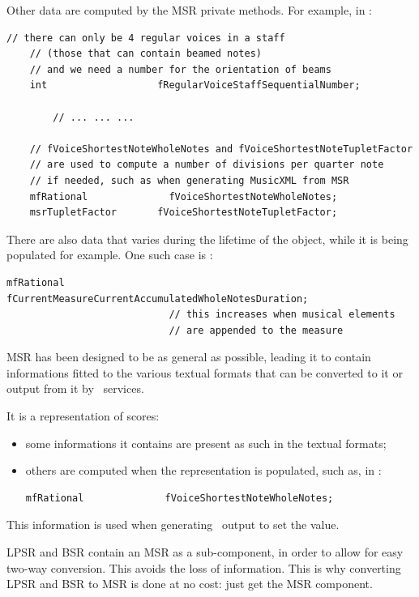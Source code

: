 Other data are computed by the MSR private methods. For example, in :
\begin{lstlisting}[language=CPlusPlus]
    // there can only be 4 regular voices in a staff
    // (those that can contain beamed notes)
    // and we need a number for the orientation of beams
    int                   fRegularVoiceStaffSequentialNumber;

		// ... ... ...

    // fVoiceShortestNoteWholeNotes and fVoiceShortestNoteTupletFactor
    // are used to compute a number of divisions per quarter note
    // if needed, such as when generating MusicXML from MSR
    mfRational              fVoiceShortestNoteWholeNotes;
    msrTupletFactor       fVoiceShortestNoteTupletFactor;
\end{lstlisting}

There are also data that varies during the lifetime of the object, while it is being populated for example.
One such case is :
\begin{lstlisting}[language=CPlusPlus]
    mfRational              fCurrentMeasureCurrentAccumulatedWholeNotesDuration;
                            // this increases when musical elements
                            // are appended to the measure
\end{lstlisting}

MSR has been designed to be as general as possible, leading it to contain informations fitted to the various textual formats that can be converted to it or output from it by \mf\ services.

It is a  representation of scores:
\begin{itemize}
\item some informations it contains are present as such in the textual formats;
\item others are computed when the representation is populated, such as, in :
\begin{lstlisting}[language=CPlusPlus]
    mfRational              fVoiceShortestNoteWholeNotes;
\end{lstlisting}
\end{itemize}
This information is used when generating \mxml\ output to set the  value.

LPSR and BSR contain an MSR as a sub-component, in order to allow for easy two-way conversion. This avoids the loss of information. This is why converting LPSR and BSR to MSR is done at no cost: just get the MSR component.

